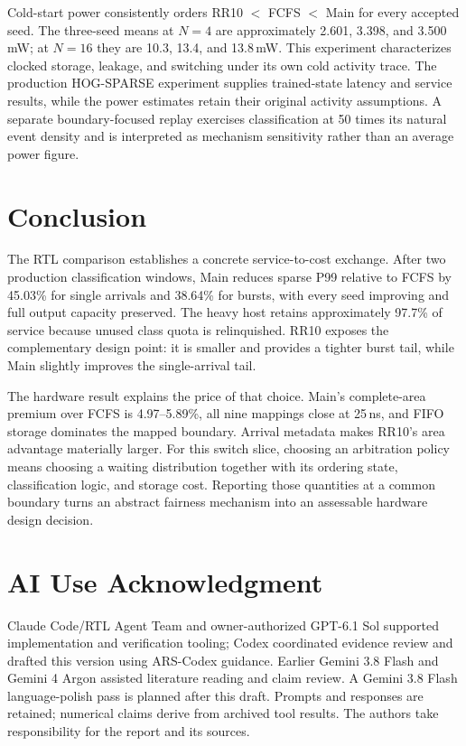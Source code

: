 Cold-start power consistently orders RR10 $<$ FCFS $<$ Main for every
accepted seed. The three-seed means at $N=4$ are approximately 2.601,
3.398, and 3.500\,mW; at $N=16$ they are 10.3, 13.4, and 13.8\,mW.
This experiment characterizes clocked storage, leakage, and switching under
its own cold activity trace. The production HOG-SPARSE experiment supplies
trained-state latency and service results, while the power estimates retain
their original activity assumptions. A separate boundary-focused replay
exercises classification at 50 times its natural event density and is
interpreted as mechanism sensitivity rather than an average power figure.

\section{Conclusion}
The RTL comparison establishes a concrete service-to-cost exchange. After
two production classification windows, Main reduces sparse P99 relative to
FCFS by 45.03\% for single arrivals and 38.64\% for bursts, with every seed
improving and full output capacity preserved. The heavy host retains
approximately 97.7\% of service because unused class quota is relinquished.
RR10 exposes the complementary design point: it is smaller and provides a
tighter burst tail, while Main slightly improves the single-arrival tail.

\newpage
The hardware result explains the price of that choice. Main's complete-area
premium over FCFS is 4.97--5.89\%, all nine mappings close at 25\,ns, and
FIFO storage dominates the mapped boundary. Arrival metadata makes RR10's
area advantage materially larger. For this switch slice, choosing an
arbitration policy means choosing a waiting distribution together with its
ordering state, classification logic, and storage cost. Reporting those
quantities at a common boundary turns an abstract fairness mechanism into
an assessable hardware design decision.

\section{AI Use Acknowledgment}
Claude Code/RTL Agent Team and owner-authorized GPT-6.1 Sol supported implementation
and verification tooling; Codex coordinated evidence review and drafted this
version using ARS-Codex guidance. Earlier Gemini 3.8 Flash and Gemini 4 Argon
assisted literature reading and claim review. A Gemini 3.8 Flash language-polish
pass is planned after this draft. Prompts and responses are retained; numerical
claims derive from archived tool results. The authors take responsibility for
the report and its sources.
